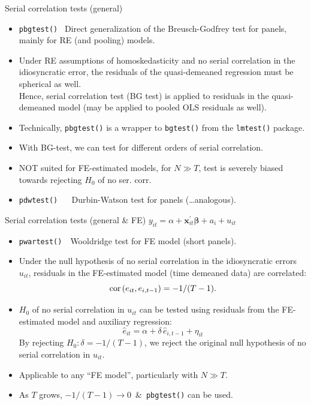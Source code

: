 \documentclass[usenames,dvipsnames]{beamer}
\begin{document}
\begin{frame}{Serial correlation tests (general)}
\begin{itemize}
    \item \texttt{pbgtest()} ~Direct generalization of the Breusch-Godfrey test for panels, mainly for RE (and pooling) models.\\
    \smallskip
    \item Under RE assumptions of homoskedasticity and no serial correlation in the idiosyncratic error, the residuals of the quasi-demeaned regression must be spherical as well.\\
    Hence, serial correlation test (BG test) is applied to residuals in the quasi-demeaned model (may be applied to pooled OLS residuals as well).\\
    \smallskip
    \item Technically, \texttt{pbgtest()} is a wrapper to \texttt{bgtest()} from the \texttt{lmtest()} package. 
    \smallskip
    \item With BG-test, we can test for different orders of serial correlation.
    \smallskip
    \item NOT suited for FE-estimated models, for $N \gg T$, test is severely biased towards rejecting $H_0$ of no ser. corr.
    \medskip
    \item \texttt{pdwtest()} ~~ Durbin-Watson test for panels (\dots analogous).
\end{itemize}
\end{frame}
\begin{frame}{Serial correlation tests (general \& FE)}
$y_{it} = \alpha + \bm{x}^{\prime}_{it} \bm{\beta} + a_i + u_{it}$\\ \medskip
\begin{itemize}
    \item \texttt{pwartest()}~~Wooldridge test for FE model (short panels).\\
    \smallskip
    \item Under the null hypothesis of no serial correlation in the idiosyncratic errors $u_{it}$, residuals in the FE-estimated model (time demeaned data) are correlated: $$\textnormal{cor}\left(e_{it},e_{i,t-1}\right)=-1/(T-1).$$
    \item $H_0$ of no serial correlation in $u_{it}$ can be tested using residuals from the FE-estimated model and auxiliary regression:
    $$ \hat{e}_{it} = \alpha + \delta \, \hat{e}_{i,t-1} + \eta_{it}$$
    By rejecting $H_0: \delta = -1/(T-1)$, we reject the original null hypothesis of no serial correlation in  $u_{it}$.
    \smallskip
    \item Applicable to any ``FE model'', particularly with $N \gg T$.
    \smallskip
    \item As $T$ grows, $-1/(T-1) \rightarrow 0$~\&~\texttt{pbgtest()} can be used.
\end{itemize}
\end{frame}
\end{document}
